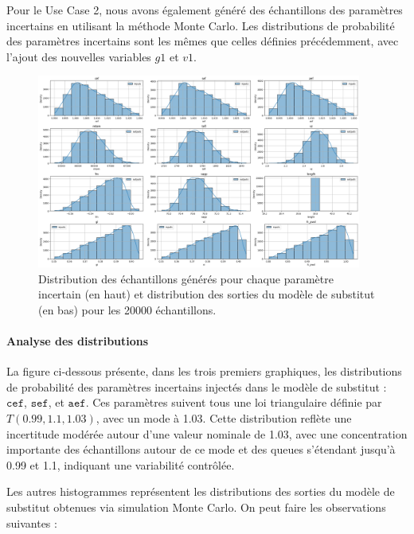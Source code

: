 \documentclass[a4paper, 11pt]{article}
\begin{document}
Pour le Use Case 2, nous avons également généré des échantillons des paramètres incertains en utilisant la méthode Monte Carlo. Les distributions de probabilité des paramètres incertains sont les mêmes que celles définies précédemment, avec l’ajout des nouvelles variables \( g1 \) et \( v1 \).


\begin{figure}[H]
    \centering
    \includegraphics[width=0.95\textwidth]{Images_Ayoub/Problem2/UseCase2/Estimating_Quantities/Input_Output_Distributions/Input_Output_Distributions.png}
    \caption{Distribution des échantillons générés pour chaque paramètre incertain (en haut) et distribution des sorties du modèle de substitut (en bas) pour les 20000 échantillons.}
    \label{fig:input_output_distributions_usecase2}
\end{figure}

\paragraph{Analyse des distributions}

La figure ci-dessous présente, dans les trois premiers graphiques, les distributions de probabilité des paramètres incertains injectés dans le modèle de substitut : \( \texttt{cef} \), \( \texttt{sef} \), et \( \texttt{aef} \). Ces paramètres suivent tous une loi triangulaire définie par \( T(0.99, 1.1, 1.03) \), avec un mode à 1.03. Cette distribution reflète une incertitude modérée autour d’une valeur nominale de 1.03, avec une concentration importante des échantillons autour de ce mode et des queues s’étendant jusqu’à 0.99 et 1.1, indiquant une variabilité contrôlée.

Les autres histogrammes représentent les distributions des sorties du modèle de substitut obtenues via simulation Monte Carlo. On peut faire les observations suivantes :
\end{document}
